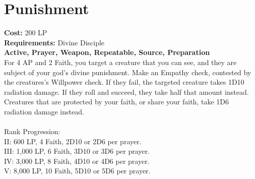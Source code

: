 \section{Punishment}\label{prayer:punishment}
\textbf{Cost:} 200 LP\\
\textbf{Requirements:} Divine Disciple \\
\textbf{Active, Prayer, Weapon, Repeatable, Source, Preparation}\\
For 4 AP and 2 Faith, you target a creature that you can see, and they are subject of your god's divine punishment.
Make an Empathy check, contested by the creatures's Willpower check.
If they fail, the targeted creature takes 1D10 radiation damage.
If they roll and succeed, they take half that amount instead.
Creatures that are protected by your faith, or share your faith, take 1D6 radiation damage instead.\\
\\
Rank Progression:\\
II: 600 LP, 4 Faith, 2D10 or 2D6 per prayer.\\
III: 1,000 LP, 6 Faith, 3D10 or 3D6 per prayer.\\
IV: 3,000 LP, 8 Faith, 4D10 or 4D6 per prayer.\\
V: 8,000 LP, 10 Faith, 5D10 or 5D6 per prayer.\\